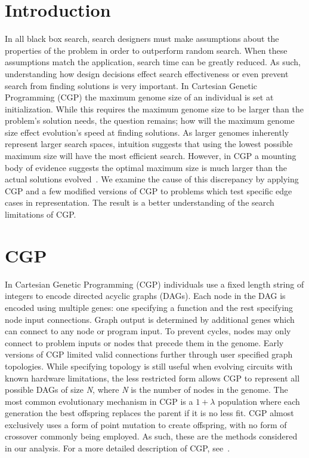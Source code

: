 \documentclass{sig-alternate}
\begin{document}
\section{Introduction}
In all black box search, search designers must make assumptions about the properties
of the problem in order to outperform random search.  When these assumptions
match the application, search time can be greatly reduced.  As such, understanding how design decisions
effect search effectiveness or even prevent search from finding solutions is very important.
%
In Cartesian Genetic Programming (CGP) the maximum genome size of an individual
is set at initialization.  While this
requires the maximum genome size to be larger than the problem's solution needs,
the question remains; how will the maximum genome size effect evolution's
speed at finding solutions.  As larger genomes inherently represent larger search
spaces, intuition suggests that using the lowest possible maximum size will have the most efficient search.
However, in CGP a mounting body of evidence suggests the optimal
maximum size is much larger than the actual solutions evolved~\cite{miller:2006:redundancy}.
We examine the cause of this discrepancy by applying CGP and a few
modified versions of CGP to problems which test specific edge cases in representation.
The result is a better understanding of the search limitations of CGP.

\section{CGP}
\label{sec-cgp}
In Cartesian Genetic Programming (CGP) individuals use a fixed length string of integers to
encode directed acyclic graphs (DAGs).  
Each node in the DAG is encoded using multiple genes: one specifying a function and
the rest specifying node input connections.
Graph output is determined by additional genes which can connect to any node or
program input.
To prevent cycles,
nodes may only connect to problem inputs or nodes that precede them in the genome.
Early versions of CGP limited valid connections further through user specified graph
topologies.
While specifying topology is still useful
when evolving circuits with known hardware limitations, the less restricted form
allows CGP to represent all possible
DAGs of size \emph{N}, where \emph{N} is the number of nodes in the genome.
%
The most common evolutionary mechanism in CGP is a $1+\lambda$ population
where each generation the best offspring replaces the parent if it is no less
fit.  CGP almost exclusively uses a form of point mutation to create offspring,
with no form of crossover commonly being employed.  As such, these are the methods
considered in our analysis.
For a more detailed description of CGP, see~\cite{miller:2011:chapter2}.
\end{document}

